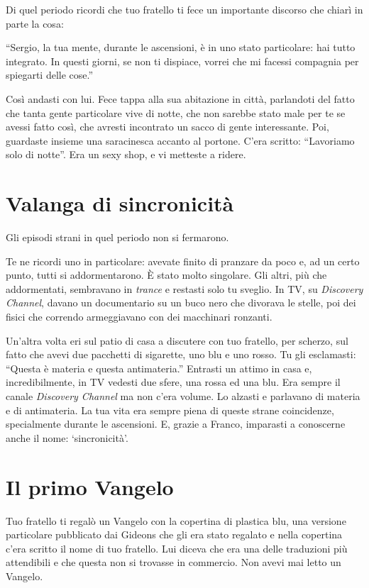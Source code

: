 Di quel periodo ricordi che tuo fratello ti fece un importante discorso che chiarì in parte la cosa:

“Sergio, la tua mente, durante le ascensioni, è in uno stato particolare: hai tutto integrato. In questi giorni, se non ti dispiace, vorrei che mi facessi compagnia per spiegarti delle cose.”

Così andasti con lui. Fece tappa alla sua abitazione in città, parlandoti del fatto che tanta gente particolare vive di notte, che non sarebbe stato male per te se avessi fatto così, che avresti incontrato un sacco di gente interessante. Poi, guardaste insieme una saracinesca accanto al portone. C'era scritto: “Lavoriamo solo di notte”. Era un sexy shop, e vi metteste a ridere.

\section{Valanga di sincronicità}
\label{valanga_di_sincronicità}

Gli episodi strani in quel periodo non si fermarono.

Te ne ricordi uno in particolare: avevate finito di pranzare da poco e, ad un certo punto, tutti si addormentarono. È stato molto singolare. Gli altri, più che addormentati, sembravano in \textit{trance} e restasti solo tu sveglio. In TV, su \textit{Discovery Channel}, davano un documentario su un buco nero che divorava le stelle, poi dei fisici che correndo armeggiavano con dei macchinari ronzanti.

Un'altra volta eri sul patio di casa a discutere con tuo fratello, per scherzo, sul fatto che avevi due pacchetti di sigarette, uno blu e uno rosso. Tu gli esclamasti: “Questa è materia e questa antimateria.” Entrasti un attimo in casa e, incredibilmente, in TV vedesti due sfere, una rossa ed una blu. Era sempre il canale \textit{Discovery Channel} ma non c'era volume. Lo alzasti e parlavano di materia e di antimateria. La tua vita era sempre piena di queste strane coincidenze, specialmente durante le ascensioni. E, grazie a Franco, imparasti a conoscerne anche il nome: ‘sincronicità’.

\section{Il primo Vangelo}
\label{vangelo}

Tuo fratello ti regalò un Vangelo con la copertina di plastica blu, una versione particolare pubblicato dai Gideons che gli era stato regalato e nella copertina c'era scritto il nome di tuo fratello. Lui diceva che era una delle traduzioni più attendibili e che questa non si trovasse in commercio. Non avevi mai letto un Vangelo.

